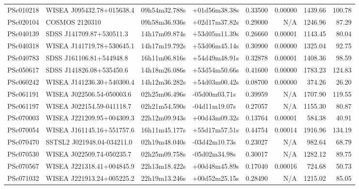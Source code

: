 \begin{longtable}{llllrrrr}
PSc010218        &       WISEA J095432.78+015638.4 &   09h54m32.788s &   +01d56m38.38s &  0.33500 &  0.00000 &  1439.66 &      100.78 \\
PSc020104        &                  COSMOS 2120310 &   09h58m36.936s &   +02d17m37.82s &  0.29000 &      N/A &  1246.96 &       87.29 \\
PSc040139        &        SDSS J141709.87+530511.3 &   14h17m09.874s &   +53d05m11.39s &  0.26660 &  0.00001 &  1143.45 &       80.04 \\
PSc040318        &       WISEA J141719.78+530645.1 &   14h17m19.792s &   +53d06m45.14s &  0.30900 &  0.00000 &  1325.04 &       92.75 \\
PSc040783        &        SDSS J161106.81+544948.8 &   16h11m06.816s &   +54d49m48.91s &  0.32878 &  0.00001 &  1408.36 &       98.59 \\
PSc050617        &        SDSS J141826.08+535450.6 &   14h18m26.086s &   +53d54m50.66s &  0.41600 &  0.00000 &  1783.23 &      124.83 \\
PSc060242        &       WISEA J141236.30+540300.4 &   14h12m36.282s &   +54d03m00.42s &  0.08700 &  0.00000 &   374.26 &       26.20 \\
PSc061191        &       WISEA J022506.54-050003.6 &   02h25m06.496s &   -05d00m03.71s &  0.39959 &      N/A &  1707.90 &      119.55 \\
PSc061197        &       WISEA J022154.59-041118.7 &   02h21m54.590s &   -04d11m19.07s &  0.27057 &      N/A &  1155.30 &       80.87 \\
PSc070003        &       WISEA J221209.95+004309.3 &   22h12m09.943s &   +00d43m09.32s &  0.13764 &  0.00001 &   584.38 &       40.91 \\
PSc070054        &       WISEA J161145.16+551757.6 &   16h11m45.177s &   +55d17m57.51s &  0.44754 &  0.00014 &  1916.96 &      134.19 \\
PSc070470        &      SSTSL2 J021948.04-034211.0 &   02h19m48.040s &   -03d42m10.73s &  0.23027 &      N/A &   982.64 &       68.79 \\
PSc070530        &       WISEA J022509.74-050235.7 &   02h25m09.758s &   -05d02m34.98s &  0.30017 &      N/A &  1282.12 &       89.75 \\
PSc070567        &       WISEA J221318.41+004845.9 &   22h13m18.422s &   +00d48m45.89s &  0.17040 &  0.00016 &   724.68 &       50.73 \\
PSc071032        &       WISEA J221913.24+005225.2 &   22h19m13.246s &   +00d52m25.15s &  0.28490 &      N/A &  1215.02 &       85.05 \\

\end{longtable}

